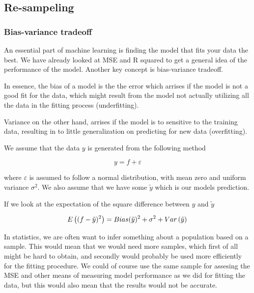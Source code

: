 \documentclass[12pt]{article}
\begin{document}
\subsection{Re-sampeling}


\subsubsection{Bias-variance tradeoff}

An essential part of machine learning is finding the model that fits your data the best.
We have already looked at MSE and R squared to get a general idea of the performance of the model.
Another key concept is bias-variance tradeoff.

In essence, the bias of a model is the the error which arrises if the model is not a good fit for the data, which might result from the model not actually utilizing all the data in the fitting process (underfitting). %

Variance on the other hand, arrises if the model is to sensitive to the training data, resulting in to little generalization on predicting for new data (overfitting).

We assume that the data $y$ is generated from the following method

\begin{equation*}
    y=f+\varepsilon
\end{equation*}

where $\varepsilon$ is assumed to follow a normal distribution, with mean zero and uniform variance $\sigma^2$.
We also assume that we have some $\tilde{y}$ which is our models prediction.

If we look at the expectation of the square difference between $y$ and $\tilde{y}$

\vspace{-1em}

\begin{equation}
 E\left((f - \tilde{y})^2\right) = Bias(\tilde{y})^2+\sigma^2+Var\left(\tilde{y}\right)\\
\end{equation}


In statistics, we are often want to infer something about a population based on a sample.
This would mean that we would need more samples, which first of all might be hard to obtain, and secondly would probably be used more efficiently for the fitting procedure.
We could of course use the same sample for assesing the MSE and other means of measuring model performance as we did for fitting the data,
but this would also mean that the results would not be accurate. %
\end{document}
